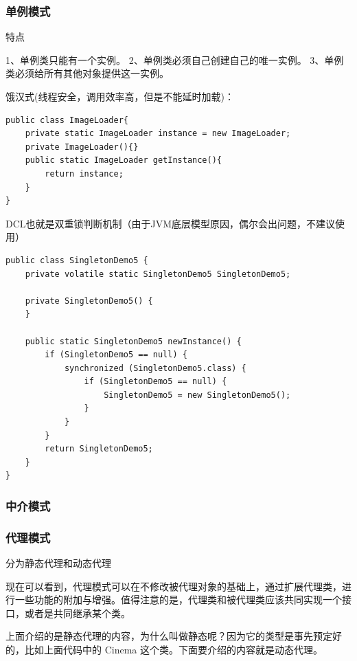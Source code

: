 \subsubsection{单例模式}
特点

1、单例类只能有一个实例。
2、单例类必须自己创建自己的唯一实例。
3、单例类必须给所有其他对象提供这一实例。

饿汉式(线程安全，调用效率高，但是不能延时加载)：
\begin{lstlisting}
public class ImageLoader{ 
	private static ImageLoader instance = new ImageLoader; 
	private ImageLoader(){} 
	public static ImageLoader getInstance(){  
		return instance;  
	} 
}
\end{lstlisting}

DCL也就是双重锁判断机制（由于JVM底层模型原因，偶尔会出问题，不建议使用）
\begin{lstlisting}
public class SingletonDemo5 {
	private volatile static SingletonDemo5 SingletonDemo5;
	
	private SingletonDemo5() {
	}
	
	public static SingletonDemo5 newInstance() {
		if (SingletonDemo5 == null) {
			synchronized (SingletonDemo5.class) {
				if (SingletonDemo5 == null) {
					SingletonDemo5 = new SingletonDemo5();
				}
			}
		}
		return SingletonDemo5;
	}
}
\end{lstlisting}


\subsubsection{中介模式}



\subsubsection{代理模式}

分为静态代理和动态代理

现在可以看到，代理模式可以在不修改被代理对象的基础上，通过扩展代理类，进行一些功能的附加与增强。值得注意的是，代理类和被代理类应该共同实现一个接口，或者是共同继承某个类。

上面介绍的是静态代理的内容，为什么叫做静态呢？因为它的类型是事先预定好的，比如上面代码中的 Cinema 这个类。下面要介绍的内容就是动态代理。

